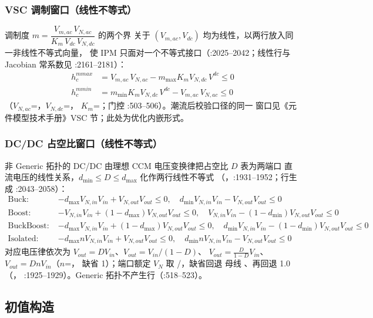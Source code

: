 \subsubsection*{VSC 调制窗口（线性不等式）}
调制度 $m=\dfrac{V_{m,ac}\,V_{N,ac}}{K_m\,V_{dc}\,V_{N,dc}}$ 的两个界
关于 $(V_{m,ac},V_{dc})$ 均为线性，以两行放入同一非线性不等式向量，
使 IPM 只面对一个不等式接口（:2025--2042；线性行与 Jacobian 常系数见
:2161--2181）：
\begin{align*}
h^{mmax}_c&=V_{m,ac}\,V_{N,ac}-m_{\max}K_mV_{N,dc}\,V^{dc}\le 0\\
h^{mmin}_c&=m_{\min}K_mV_{N,dc}\,V^{dc}-V_{m,ac}\,V_{N,ac}\le 0
\end{align*}
（$V_{N,ac}$=，$V_{N,dc}$=，
$K_m$=；门控 :503--506）。潮流后校验口径的同一
窗口见《元件模型技术手册》VSC 节；此处为优化内嵌形式。

\subsubsection*{DC/DC 占空比窗口（线性不等式）}
非 Generic 拓扑的 DC/DC 由理想 CCM 电压变换律把占空比 $D$ 表为两端口
直流电压的线性关系，$d_{\min}\le D\le d_{\max}$ 化作两行线性不等式
（，:1931--1952；行生成 :2043--2058）：
\begin{align*}
\text{Buck:}\;&{-d_{\max}}V_{N,in}V_{in}+V_{N,out}V_{out}\le 0,\quad
 d_{\min}V_{N,in}V_{in}-V_{N,out}V_{out}\le 0\\
\text{Boost:}\;&{-V_{N,in}V_{in}}+(1-d_{\max})V_{N,out}V_{out}\le 0,\quad
 V_{N,in}V_{in}-(1-d_{\min})V_{N,out}V_{out}\le 0\\
\text{BuckBoost:}\;&{-d_{\max}V_{N,in}V_{in}}+(1-d_{\max})V_{N,out}V_{out}\le 0,\quad
 d_{\min}V_{N,in}V_{in}-(1-d_{\min})V_{N,out}V_{out}\le 0\\
\text{Isolated:}\;&{-d_{\max}nV_{N,in}V_{in}}+V_{N,out}V_{out}\le 0,\quad
 d_{\min}nV_{N,in}V_{in}-V_{N,out}V_{out}\le 0
\end{align*}
对应电压律依次为 $V_{out}=DV_{in}$、$V_{out}=V_{in}/(1-D)$、
$V_{out}=\tfrac{D}{1-D}V_{in}$、$V_{out}=DnV_{in}$（$n$=，
缺省 1）；端口额定 $V_N$ 取 /，缺省回退
母线 、再回退 1.0（，
:1925--1929）。Generic 拓扑不产生行（:518--523）。

\subsection{初值构造}

